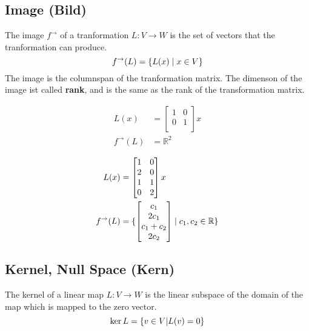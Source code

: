 \subsection{Image (Bild)}
The image \(f^{\rightarrow}\) of a tranformation \(L: V \rightarrow W \) is the set of vectors that the tranformation can produce.
\begin{equation}
    f^{\rightarrow} (L)  = \{L(x) \mid x \in V \}
\end{equation}
The image is the columnspan of the tranformation matrix. The dimenson of the image ist called \textbf{rank}, and is the
same as the rank of the transformation matrix.
\begin{example}
    \begin{align*}
        L(x)                & = \begin{bmatrix}
            1 & 0 \\
            0 & 1 \\
        \end{bmatrix}x \\
        f^{\rightarrow} (L) & = \mathbb{R}^2
    \end{align*}
\end{example}
\begin{example}
    \begin{align*}
        L(x)                & = \begin{bmatrix}
            1 & 0 \\
            2 & 0 \\
            1 & 1 \\
            0 & 2 \\
        \end{bmatrix}x      \\
        f^{\rightarrow} (L) & = \{\begin{bmatrix}
                c_1 \\ 2c_1 \\ c_1 + c_2 \\ 2 c_2
            \end{bmatrix}
         \mid c_1, c_2 \in \mathbb{R} \}
    \end{align*}
\end{example}
\subsection{Kernel, Null Space (Kern)}\label{kernel}
The kernel of a linear map \(L: V \rightarrow W \) is the linear subspace of the domain of the map which is mapped to the zero vector.
\begin{equation}
    \ker L = \{ v \in V | L(v) = 0 \} \\
\end{equation}

